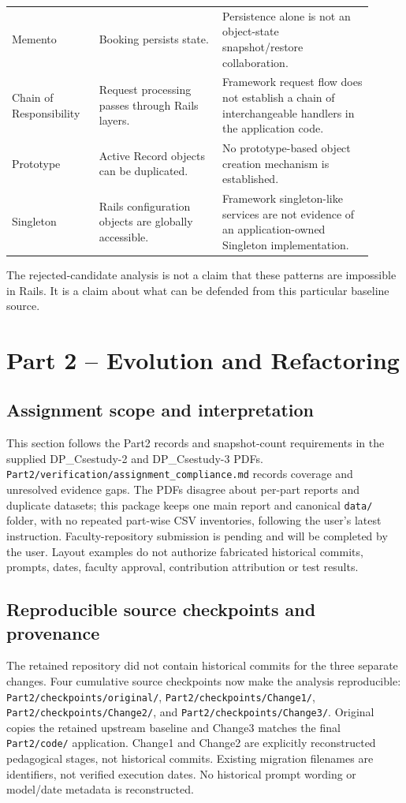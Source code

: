 \documentclass[10pt,a4paper]{article}
\newcommand{\code}[1]{\texttt{\small #1}}
\begin{document}
\begin{longtable}{p{0.22\linewidth}p{0.31\linewidth}p{0.38\linewidth}}
Memento & Booking persists state. & Persistence alone is not an object-state snapshot/restore collaboration.\\
Chain of Responsibility & Request processing passes through Rails layers. & Framework request flow does not establish a chain of interchangeable handlers in the application code.\\
Prototype & Active Record objects can be duplicated. & No prototype-based object creation mechanism is established.\\
Singleton & Rails configuration objects are globally accessible. & Framework singleton-like services are not evidence of an application-owned Singleton implementation.\\
\bottomrule
\end{longtable}

The rejected-candidate analysis is not a claim that these patterns are impossible in Rails. It is a claim about what can be defended from this particular baseline source.

\section{Part 2 -- Evolution and Refactoring}

\subsection{Assignment scope and interpretation}

This section follows the Part2 records and snapshot-count requirements in the supplied DP\_Csestudy-2 and DP\_Csestudy-3 PDFs. \code{Part2/verification/assignment\_compliance.md} records coverage and unresolved evidence gaps. The PDFs disagree about per-part reports and duplicate datasets; this package keeps one main report and canonical \code{data/} folder, with no repeated part-wise CSV inventories, following the user's latest instruction. Faculty-repository submission is pending and will be completed by the user. Layout examples do not authorize fabricated historical commits, prompts, dates, faculty approval, contribution attribution or test results.

\subsection{Reproducible source checkpoints and provenance}

The retained repository did not contain historical commits for the three separate changes. Four cumulative source checkpoints now make the analysis reproducible: \code{Part2/checkpoints/original/}, \code{Part2/checkpoints/Change1/}, \code{Part2/checkpoints/Change2/}, and \code{Part2/checkpoints/Change3/}. Original copies the retained upstream baseline and Change3 matches the final \code{Part2/code/} application. Change1 and Change2 are explicitly reconstructed pedagogical stages, not historical commits. Existing migration filenames are identifiers, not verified execution dates. No historical prompt wording or model/date metadata is reconstructed.
\end{document}
